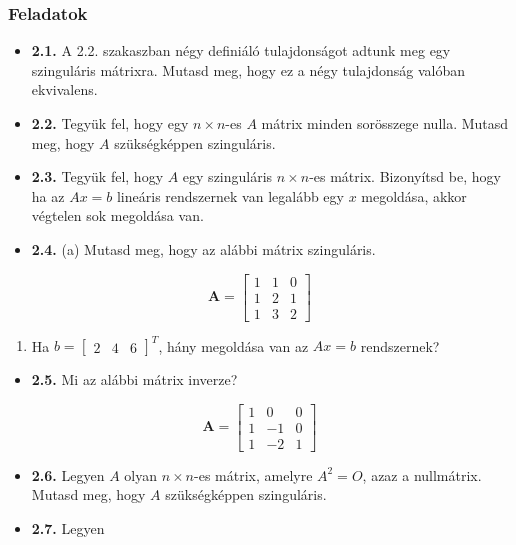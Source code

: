 \documentclass[
  magyar,
  11pt]{article}
\providecommand{\tightlist}{%
  \setlength{\itemsep}{0pt}\setlength{\parskip}{0pt}}
\providecommand{\boldsymbol}[1]{\mathbf{#1}}
\begin{document}
\subsubsection{Feladatok}\label{feladatok-1}

\begin{itemize}
\tightlist
\item
  \textbf{2.1.} A 2.2. szakaszban négy definiáló tulajdonságot adtunk
  meg egy szinguláris mátrixra. Mutasd meg, hogy ez a négy tulajdonság
  valóban ekvivalens.
\item
  \textbf{2.2.} Tegyük fel, hogy egy \(n \times n\)-es \(A\) mátrix
  minden sorösszege nulla. Mutasd meg, hogy \(A\) szükségképpen
  szinguláris.
\item
  \textbf{2.3.} Tegyük fel, hogy \(A\) egy szinguláris \(n \times n\)-es
  mátrix. Bizonyítsd be, hogy ha az \(Ax = b\) lineáris rendszernek van
  legalább egy \(x\) megoldása, akkor végtelen sok megoldása van.
\item
  \textbf{2.4.} (a) Mutasd meg, hogy az alábbi mátrix szinguláris.
\end{itemize}

\[\boldsymbol{A} = \begin{bmatrix} 1 & 1 & 0 \\ 1 & 2 & 1 \\ 1 & 3 & 2 \end{bmatrix}\]

\begin{enumerate}
\def\labelenumi{(\alph{enumi})}
\setcounter{enumi}{1}
\tightlist
\item
  Ha \(b = \begin{bmatrix} 2 & 4 & 6 \end{bmatrix}^T\), hány megoldása
  van az \(Ax = b\) rendszernek?
\end{enumerate}

\begin{itemize}
\tightlist
\item
  \textbf{2.5.} Mi az alábbi mátrix inverze?
\end{itemize}

\[\mathbf{A} = \begin{bmatrix} 1 & 0 & 0 \\ 1 & -1 & 0 \\ 1 & -2 & 1 \end{bmatrix}\]

\begin{itemize}
\tightlist
\item
  \textbf{2.6.} Legyen \(A\) olyan \(n \times n\)-es mátrix, amelyre
  \(A^2 = O\), azaz a nullmátrix. Mutasd meg, hogy \(A\) szükségképpen
  szinguláris.
\item
  \textbf{2.7.} Legyen
\end{itemize}
\end{document}
